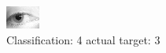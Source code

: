 \begin{figure}[h!]
\begin{center}
\includegraphics[width=0.60\columnwidth]{figures/ID1393_class_4_target_3.png}
\end{center}
\caption{ Classification: 4 actual target: 3}
\label{fig:ID1393_class_4_target_3}
\end{figure}
